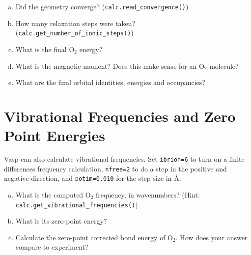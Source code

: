 \documentclass[11pt]{article}
\begin{document}
\begin{enumerate}[(a)]
\item Did the geometry converge? (\verb~calc.read_convergence()~)

\item How many relaxation steps were taken? (\verb~calc.get_number_of_ionic_steps()~)

\item What is the final O$_{\text{2}}$ energy?

\item What is the magnetic moment? Does this make sense for an O$_{\text{2}}$ molecule?

\item What are the final orbital identities, energies and occupancies?
\end{enumerate}

\section{Vibrational Frequencies and Zero Point Energies}
\label{sec-5}

Vasp can also calculate vibrational frequencies. Set \verb~ibrion=6~ to turn on a finite-differences frequency calculation, \verb~nfree=2~ to do a step in the positive and negative direction, and \verb~potim=0.010~ for the step size in \AA{}.

\begin{enumerate}[(a)]
\item What is the computed O$_{\text{2}}$ frequency, in wavenumbers? (Hint: \verb~calc.get_vibrational_frequencies()~)

\item What is its zero-point energy?

\item Calculate the zero-point corrected bond energy of O$_{\text{2}}$. How does your answer compare to experiment?
\end{enumerate}
\end{document}
